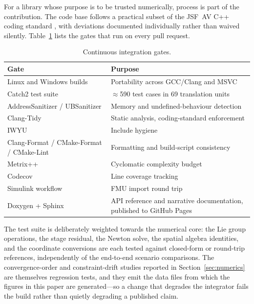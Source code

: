 \documentclass[a4paper,10pt]{article}
\theoremstyle{definition}
\begin{document}
For a library whose purpose is to be trusted numerically, process is part of
the contribution.  The code base follows a practical subset of the JSF~AV C++
coding standard \citep{jsfav2005}, with deviations documented individually
rather than waived silently.  Table~\ref{tab:ci} lists the gates that run on
every pull request.

\begin{table}[h]
  \centering
  \caption{Continuous integration gates.}
  \label{tab:ci}
  \small
  \begin{tabular}{ll}
    \toprule
    Gate & Purpose \\
    \midrule
    Linux and Windows builds        & Portability across GCC/Clang and MSVC \\
    Catch2 test suite               & $\approx$\num{590} test cases in 69 translation units \\
    AddressSanitizer / UBSanitizer  & Memory and undefined-behaviour detection \\
    Clang-Tidy                      & Static analysis, coding-standard enforcement \\
    IWYU                            & Include hygiene \\
    Clang-Format / CMake-Format / CMake-Lint & Formatting and build-script consistency \\
    Metrix++                        & Cyclomatic complexity budget \\
    Codecov                         & Line coverage tracking \\
    Simulink workflow               & FMU import round trip \\
    Doxygen + Sphinx                & API reference and narrative documentation, published to GitHub Pages \\
    \bottomrule
  \end{tabular}
\end{table}

The test suite is deliberately weighted towards the numerical core: the Lie
group operations, the stage residual, the Newton solve, the spatial algebra
identities, and the coordinate conversions are each tested against closed-form
or round-trip references, independently of the end-to-end scenario
comparisons.  The convergence-order and constraint-drift studies reported in
Section~\ref{sec:numerics} are themselves regression tests, and they emit the
data files from which the figures in this paper are generated---so a change
that degrades the integrator fails the build rather than quietly degrading a
published claim.
\end{document}
